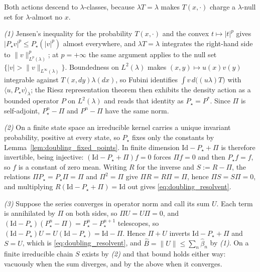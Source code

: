Both actions descend to $\lambda$-classes, because $\lambda T=\lambda$ makes $T(x,\cdot)$
charge a $\lambda$-null set for $\lambda$-almost no $x$.

\emph{(1)} Jensen's inequality for the probability $T(x,\cdot)$ and the convex $t\mapsto|t|^p$
gives $|P_\star v|^p\leq P_\star(|v|^p)$ almost everywhere, and $\lambda T=\lambda$ integrates
the right-hand side to $\|v\|_{L^p(\lambda)}^p$; at $p=+\infty$ the same argument applies to
the null set $\{|v|>\|v\|_{L^\infty(\lambda)}\}$. Boundedness on $L^2(\lambda)$ makes
$(x,y)\mapsto u(x)v(y)$ integrable against $T(x,dy)\lambda(dx)$, so Fubini identifies
$\int v\,d\bigl((u\lambda)T\bigr)$ with $\langle u,P_\star v\rangle_\lambda$; the Riesz
representation theorem then exhibits the density action as a bounded operator $P$ on
$L^2(\lambda)$ and reads that identity as $P_\star=P^*$. Since $\Pi$ is self-adjoint,
$P_\star^n-\Pi$ and $P^n-\Pi$ have the same norm.

\emph{(2)} On a finite state space an irreducible kernel carries a unique invariant
probability, positive at every state, so $P_\star$ fixes only the constants by
Lemma~\ref{lem:doubling_fixed_points}. In finite dimension $\mathrm{Id}-P_\star+\Pi$ is
therefore invertible, being injective: $(\mathrm{Id}-P_\star+\Pi)f=0$ forces $\Pi f=0$ and
then $P_\star f=f$, so $f$ is a constant of zero mean. Writing $R$ for the inverse and
$S:=R-\Pi$, the relations $\Pi P_\star=P_\star\Pi=\Pi$ and $\Pi^2=\Pi$ give $\Pi R=R\Pi=\Pi$,
hence $\Pi S=S\Pi=0$, and multiplying $R(\mathrm{Id}-P_\star+\Pi)=\mathrm{Id}$ out gives
\eqref{eq:doubling_resolvent}.

\emph{(3)} Suppose the series converges in operator norm and call its sum $U$. Each term is
annihilated by $\Pi$ on both sides, so $\Pi U=U\Pi=0$, and
$(\mathrm{Id}-P_\star)(P_\star^n-\Pi)=P_\star^n-P_\star^{n+1}$ telescopes, so
$(\mathrm{Id}-P_\star)U=U(\mathrm{Id}-P_\star)=\mathrm{Id}-\Pi$. Hence $\Pi+U$ inverts
$\mathrm{Id}-P_\star+\Pi$ and $S=U$, which is \eqref{eq:doubling_resolvent}, and
$\widehat B=\|U\|\leq\sum_n\widehat\beta_n$ by \emph{(1)}. On a finite irreducible chain
$S$ exists by \emph{(2)} and that bound holds either way: vacuously when the sum diverges,
and by the above when it converges.
